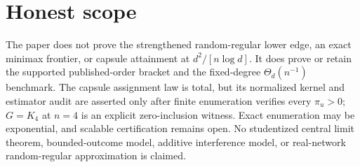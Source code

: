 \documentclass{article}
\begin{document}
\section{Honest scope}

The paper does not prove the strengthened random-regular lower edge, an exact minimax frontier, or capsule attainment at \(d^2/[n\log d]\). It does prove or retain the supported published-order bracket and the fixed-degree \(\Theta_d(n^{-1})\) benchmark. The capsule assignment law is total, but its normalized kernel and estimator audit are asserted only after finite enumeration verifies every \(\pi_u>0\); \(G=K_4\) at \(n=4\) is an explicit zero-inclusion witness. Exact enumeration may be exponential, and scalable certification remains open. No studentized central limit theorem, bounded-outcome model, additive interference model, or real-network random-regular approximation is claimed.
\end{document}
